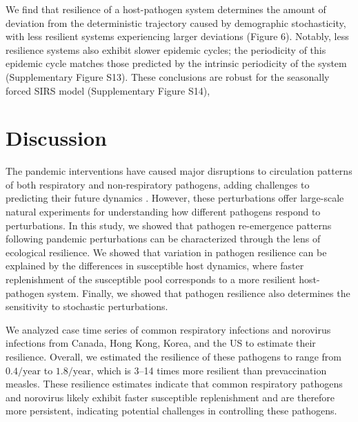 \documentclass[12pt]{article}
\begin{document}
We find that resilience of a host-pathogen system determines  the amount of deviation from the deterministic trajectory caused by demographic stochasticity, with less resilient systems experiencing larger deviations (Figure 6).
Notably, less resilience systems also exhibit slower epidemic cycles; the periodicity of this epidemic cycle matches those predicted by the intrinsic periodicity of the system (Supplementary Figure S13).
These conclusions are robust for the seasonally forced SIRS model (Supplementary Figure S14),

\section*{Discussion}

The pandemic interventions have caused major disruptions to circulation patterns of both respiratory and non-respiratory pathogens, adding challenges to predicting their future dynamics \citep{baker2020impact,gomez2021uncertain,koltai2022determinants,park2024predicting}.
However, these perturbations offer large-scale natural experiments for understanding how different pathogens respond to perturbations.
In this study, we showed that pathogen re-emergence patterns following pandemic perturbations can be characterized through the lens of ecological resilience.
We showed that variation in pathogen resilience can be explained by the differences in susceptible host dynamics, where faster replenishment of the susceptible pool corresponds to a more resilient host-pathogen system.
Finally, we showed that pathogen resilience also determines the sensitivity to stochastic perturbations.

We analyzed case time series of common respiratory infections and norovirus infections from Canada, Hong Kong, Korea, and the US to estimate their resilience.
Overall, we estimated the resilience of these pathogens to range from $0.4/\mathrm{year}$ to $1.8/\mathrm{year}$, which is 3--14 times more resilient than prevaccination measles.
These resilience estimates indicate that common respiratory pathogens and norovirus likely exhibit faster susceptible replenishment and are therefore more persistent, indicating potential challenges in controlling these pathogens.
\end{document}
